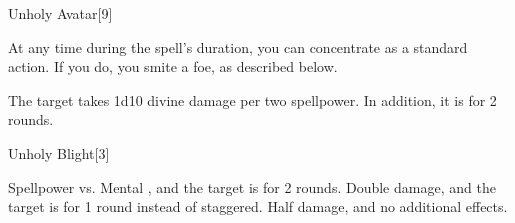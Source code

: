 
\begin{spellsection}{Unholy Avatar}[9]
    \begin{spellheader}
    \end{spellheader}
    \begin{spellcontent}
        \begin{spelltargetinginfo}
        \end{spelltargetinginfo}
        \begin{spelleffects}
            \spelleffect At any time during the spell's duration, you can concentrate as a standard action. If you do, you smite a foe, as described below.
            \spelldur \durlong
        \end{spelleffects}
    \end{spellcontent}
    \begin{spellsubcontent}
        \begin{spelltargetinginfo}
        \end{spelltargetinginfo}
        \begin{spelleffects}
            \spelleffect The target takes 1d10 divine damage per two spellpower. In addition, it is \staggered for 2 rounds.
        \end{spelleffects}
    \end{spellsubcontent}
    \begin{spellfooter}
        \miscastexplode
    \end{spellfooter}
\end{spellsection}

\begin{spellsection}{Unholy Blight}[3]
    \begin{spellheader}
    \end{spellheader}
    \begin{spellcontent}
        \begin{spelltargetinginfo}
        \end{spelltargetinginfo}
        \begin{spelleffects}
            \begin{spellattack}{Spellpower vs. Mental}
                \spellsuccess {}, and the target is \staggered for 2 rounds.
                \spellcritical Double damage, and the target is \nauseated for 1 round instead of staggered.
                \spellfailure Half damage, and no additional effects.
            \end{spellattack}
        \end{spelleffects}
    \end{spellcontent}
    \begin{spellfooter}
        \miscastrandom
    \end{spellfooter}
\end{spellsection}

